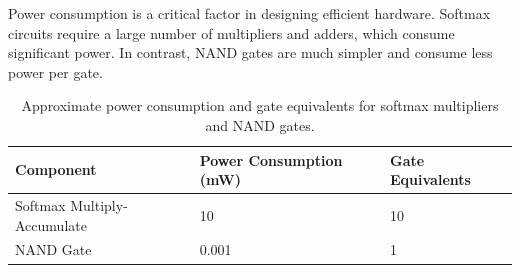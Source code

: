 Power consumption is a critical factor in designing efficient hardware. Softmax circuits require a large number of multipliers and adders, which consume significant power. In contrast, NAND gates are much simpler and consume less power per gate.













\begin{table}[h]






\centering






\begin{tabular}{|l|l|l|}






\hline






Component & Power Consumption (mW) & Gate Equivalents \\ \hline






Softmax Multiply-Accumulate & 10 & 10 \\ \hline






NAND Gate & 0.001 & 1 \\ \hline






\end{tabular}






\caption{Approximate power consumption and gate equivalents for softmax multipliers and NAND gates.}






\label{tab:power-comparison}






\end{table}













